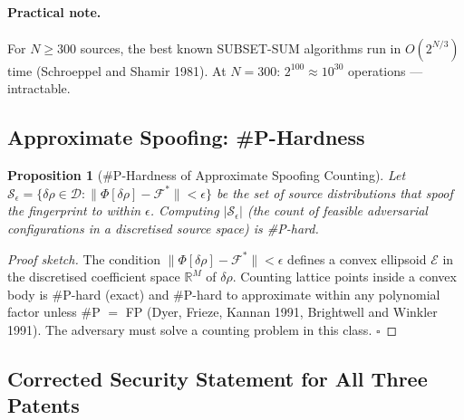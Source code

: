 \documentclass[aps,prd,twocolumn,superscriptaddress,nofootinbib]{revtex4-2}
\newcommand{\Fingerprint}{\mathcal{F}}
\newtheorem{proposition}[theorem]{Proposition}
\begin{document}
\paragraph{Practical note.} For $N \geq 300$ sources, the best known
SUBSET-SUM algorithms run in $O(2^{N/3})$ time (Schroeppel and Shamir 1981).
At $N = 300$: $2^{100} \approx 10^{30}$ operations --- intractable.

\subsection{Approximate Spoofing: \#P-Hardness}

\begin{proposition}[\#P-Hardness of Approximate Spoofing Counting]
\label{prop:counting-hard}
Let $\mathcal{S}_\epsilon = \{\delta\rho \in \mathcal{D} : \|\Phi[\delta\rho]
- \Fingerprint^*\| < \epsilon\}$ be the set of source distributions that
spoof the fingerprint to within $\epsilon$. Computing $|\mathcal{S}_\epsilon|$
(the count of feasible adversarial configurations in a discretised source
space) is \#P-hard.
\end{proposition}

\begin{proof}[Proof sketch]
The condition $\|\Phi[\delta\rho] - \Fingerprint^*\| < \epsilon$ defines
a convex ellipsoid $\mathcal{E}$ in the discretised coefficient space
$\mathbb{R}^M$ of $\delta\rho$. Counting lattice points inside a convex
body is \#P-hard (exact) and \#P-hard to approximate within any polynomial
factor unless \#P $=$ FP (Dyer, Frieze, Kannan 1991, Brightwell and
Winkler 1991). The adversary must solve a counting problem in this class.
$\square$
\end{proof}

\subsection{Corrected Security Statement for All Three Patents}
\end{document}
